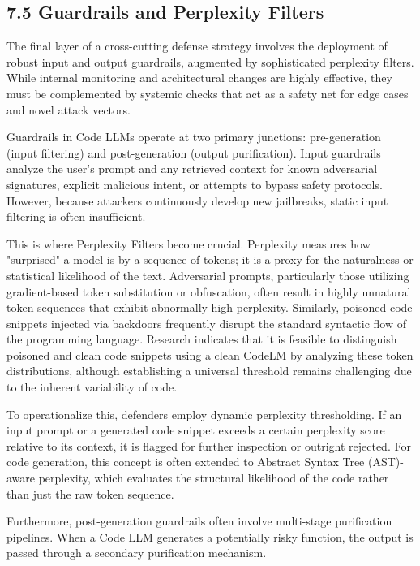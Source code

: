\documentclass[11pt,a4paper]{article}
\begin{document}
\subsection{7.5 Guardrails and Perplexity Filters}

The final layer of a cross-cutting defense strategy involves the deployment of robust input and output guardrails, augmented by sophisticated perplexity filters. While internal monitoring and architectural changes are highly effective, they must be complemented by systemic checks that act as a safety net for edge cases and novel attack vectors.

Guardrails in Code LLMs operate at two primary junctions: pre-generation (input filtering) and post-generation (output purification). Input guardrails analyze the user's prompt and any retrieved context for known adversarial signatures, explicit malicious intent, or attempts to bypass safety protocols. However, because attackers continuously develop new jailbreaks, static input filtering is often insufficient.

This is where Perplexity Filters become crucial. Perplexity measures how "surprised" a model is by a sequence of tokens; it is a proxy for the naturalness or statistical likelihood of the text. Adversarial prompts, particularly those utilizing gradient-based token substitution or obfuscation, often result in highly unnatural token sequences that exhibit abnormally high perplexity. Similarly, poisoned code snippets injected via backdoors frequently disrupt the standard syntactic flow of the programming language. Research indicates that it is feasible to distinguish poisoned and clean code snippets using a clean CodeLM by analyzing these token distributions, although establishing a universal threshold remains challenging due to the inherent variability of code.

To operationalize this, defenders employ dynamic perplexity thresholding. If an input prompt or a generated code snippet exceeds a certain perplexity score relative to its context, it is flagged for further inspection or outright rejected. For code generation, this concept is often extended to Abstract Syntax Tree (AST)-aware perplexity, which evaluates the structural likelihood of the code rather than just the raw token sequence.

Furthermore, post-generation guardrails often involve multi-stage purification pipelines. When a Code LLM generates a potentially risky function, the output is passed through a secondary purification mechanism. 
\end{document}
